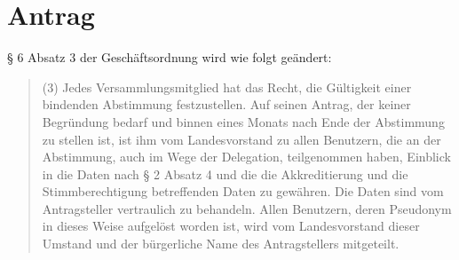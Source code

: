 \section{Antrag}

§ 6 Absatz 3 der Geschäftsordnung wird wie folgt geändert:

\begin{quote}
(3) Jedes Versammlungsmitglied hat das Recht, die Gültigkeit einer bindenden Abstimmung festzustellen. Auf seinen Antrag, der keiner Begründung bedarf und binnen eines Monats nach Ende der Abstimmung zu stellen ist, ist ihm vom Landesvorstand zu allen Benutzern, die an der Abstimmung, auch im Wege der Delegation, teilgenommen haben, Einblick in die Daten nach § 2 Absatz 4 und die die Akkreditierung und die Stimmberechtigung betreffenden Daten zu gewähren. Die Daten sind vom Antragsteller vertraulich zu behandeln. Allen Benutzern, deren Pseudonym in dieses Weise aufgelöst worden ist, wird vom Landesvorstand dieser Umstand und der bürgerliche Name des Antragstellers mitgeteilt.

\end{quote}
